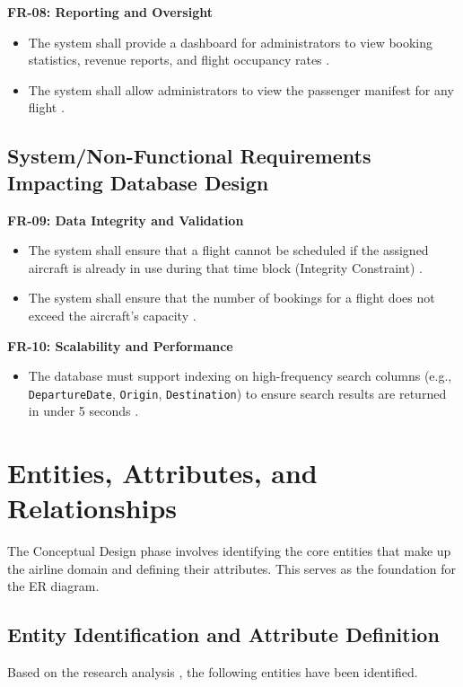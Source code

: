 \documentclass[12pt, a4paper]{article}
\begin{document}
	\textbf{FR-08: Reporting and Oversight}
	\begin{itemize}
		\item The system shall provide a dashboard for administrators to view booking statistics, revenue reports, and flight occupancy rates \cite{ref26}.
		\item The system shall allow administrators to view the passenger manifest for any flight \cite{ref30}.
	\end{itemize}
	
	\subsection{System/Non-Functional Requirements Impacting Database Design}
	
	\textbf{FR-09: Data Integrity and Validation}
	\begin{itemize}
		\item The system shall ensure that a flight cannot be scheduled if the assigned aircraft is already in use during that time block (Integrity Constraint) \cite{ref16}.
		\item The system shall ensure that the number of bookings for a flight does not exceed the aircraft's capacity \cite{ref16}.
	\end{itemize}
	
	\textbf{FR-10: Scalability and Performance}
	\begin{itemize}
		\item The database must support indexing on high-frequency search columns (e.g., \texttt{DepartureDate}, \texttt{Origin}, \texttt{Destination}) to ensure search results are returned in under 5 seconds \cite{ref34}.
	\end{itemize}
	
	\newpage
	\section{Entities, Attributes, and Relationships}
	
	The Conceptual Design phase involves identifying the core entities that make up the airline domain and defining their attributes. This serves as the foundation for the ER diagram.
	
	\subsection{Entity Identification and Attribute Definition}
	
	Based on the research analysis \cite{ref16, ref35, ref36, ref37}, the following entities have been identified.
	
\end{document}
